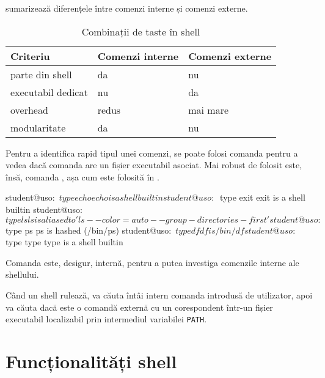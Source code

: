  sumarizează diferențele între comenzi interne și comenzi
externe.

\begin{table}[!htb]
  \begin{center}
    \begin{tabular}{ p{} p{} p{} }
      \toprule
        \textbf{Criteriu} &
        \textbf{Comenzi interne} &
        \textbf{Comenzi externe} \\
      \midrule
        parte din shell &
        da &
        nu \\

        executabil dedicat &
        nu &
        da \\

        overhead &
        redus &
        mai mare \\

        modularitate &
        da &
        nu \\
      \bottomrule
    \end{tabular}
  \end{center}
  \caption{Combinații de taste în shell}
  \label{tab:cli:internal-vs-external}
\end{table}

Pentru a identifica rapid tipul unei comenzi, se poate folosi comanda 
pentru a vedea dacă comanda are un fișier executabil asociat. Mai robust de
folosit este, însă, comanda , așa cum este folosită în .

\begin{screen}[caption={Tipul unei comenzi (type)},label={lst:cli:type}]
student@uso:~$ type echo
echo is a shell builtin
student@uso:~$ type exit
exit is a shell builtin
student@uso:~$ type ls
ls is aliased to 'ls --color=auto --group-directories-first'
student@uso:~$ type ps
ps is hashed (/bin/ps)
student@uso:~$ type df
df is /bin/df
student@uso:~$ type type
type is a shell builtin
\end{screen}

Comanda  este, desigur, internă, pentru a putea investiga comenzile interne
ale shellului.

Când un shell rulează, va căuta întâi intern comanda introdusă de utilizator,
apoi va căuta dacă este o comandă externă cu un corespondent într-un fișier
executabil localizabil prin intermediul variabilei \texttt{PATH}.

\section{Funcționalități shell}
\label{sec:cli:shell-func}


